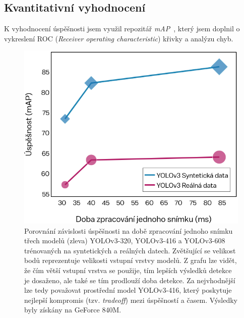 \documentclass[czech]{ExcelAtFIT} %
\begin{document}
\subsection{Kvantitativní vyhodnocení}
K vyhodnocení úspěšnosti jsem využil repozitář \emph{mAP}~\cite{mAP_repo}, který jsem doplnil o vykreslení ROC (\emph{Receiver operating characteristic}) křivky a analýzu chyb.

\begin{figure}[t]\centering
    \centering
    \includegraphics[width=0.99\linewidth]{images/map_ms_tradeoff.png}
    \caption{Porovnání závislosti úspěšnosti na době zpracování jednoho snímku třech modelů (zleva) YOLOv3-320, YOLOv3-416 a YOLOv3-608 trénovaných na syntetických a reálných datech. Zvětšující se velikost bodů reprezentuje velikosti vstupní vrstvy modelů. Z grafu lze vidět, že čím větší vstupní vrstva se použije, tím lepších výsledků detekce je dosaženo, ale také se tím prodlouží doba detekce. Za nejvhodnější lze tedy považovat prostřední model YOLOv3-416, který poskytuje nejlepší kompromis (tzv. \emph{tradeoff}) mezi úspěšností a časem. Výsledky byly získány na GeForce 840M.}
    \label{fig:porovnaniMapMs}
\end{figure}
\end{document}
